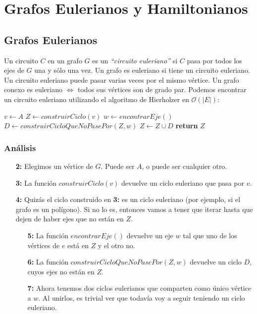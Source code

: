\newpage
\section{Grafos Eulerianos y Hamiltonianos}

\subsection{Grafos Eulerianos}

Un circuito $C$ en un grafo $G$ es un \emph{``circuito euleriano''} si $C$ pasa por todos los ejes de $G$ una y s\'olo una vez. Un grafo es euleriano si tiene un circuito euleriano. Un circuito euleriano puede pasar varias veces por el mismo v\'ertice. Un grafo conexo es euleriano $\Leftrightarrow$ todos sus v\'ertices son de grado par. Podemos encontrar un circuito euleriano utilizando el algoritmo de Hierholzer en $\mathcal{O}(|E|)$: 

\begin{algorithm}
\begin{algorithmic}[1]
  \State $v \gets A$
  \State $Z \gets construirCiclo(v)$
    \State $w \gets encontrarEje()$
    \State $D \gets construirCicloQueNoPasePor(Z, w)$
    \State $Z \gets Z \cup D$
  \EndWhile
  \State \textbf{return} $Z$
\EndFunction
\end{algorithmic}
\end{algorithm}

\subsubsection*{An\'alisis}

\begin{enumerate}
  \item [\textbf{2:}] Elegimos un v\'ertice de $G$. Puede ser $A$, o puede ser cualquier otro.
  \item [\textbf{3:}] La funci\'on $construirCiclo(v)$ devuelve un ciclo euleriano que pasa por $v$.
  \item [\textbf{4:}] Quiz\'as el ciclo construido en \textbf{3:} es un ciclo euleriano (por ejemplo, si el grafo es un pol\'igono). Si no lo es, entonces vamos a tener que iterar hasta que dejen de haber ejes que no est\'an en $Z$.
  \begin{enumerate}
    \item [\textbf{5:}] La funci\'on $encontrarEje()$ devuelve un eje $w$ tal que uno de los v\'ertices de $e$ est\'a en $Z$ y el otro no.
    \item [\textbf{6:}] La funci\'on $construirCicloQueNoPasePor(Z, w)$ devuelve un ciclo $D$, cuyos ejes no est\'an en $Z$.
    \item [\textbf{7:}] Ahora tenemos dos ciclos eulerianos que comparten como \'unico v\'ertice a $w$. Al unirlos, es trivial ver que todav\'ia voy a seguir teniendo un ciclo euleriano.
  \end{enumerate}
\end{enumerate}

